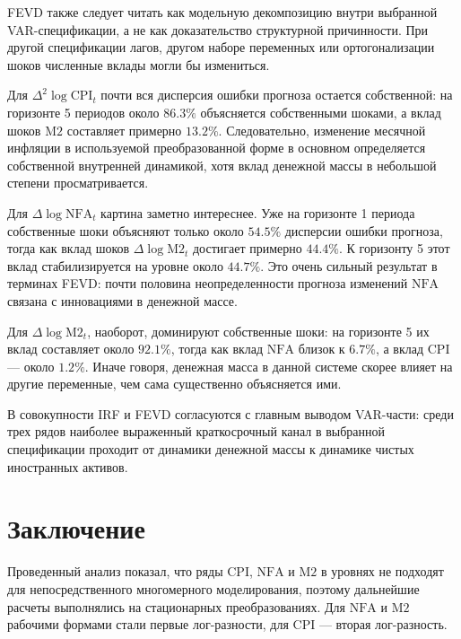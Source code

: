 \documentclass[12pt,a4paper]{article}
\begin{document}
FEVD также следует читать как модельную декомпозицию внутри выбранной VAR-спецификации, а
не как доказательство структурной причинности. При другой спецификации лагов, другом наборе
переменных или ортогонализации шоков численные вклады могли бы измениться.

Для $\Delta^2 \log \mathrm{CPI}_t$ почти вся дисперсия ошибки прогноза остается собственной:
на горизонте 5 периодов около $86.3\%$ объясняется собственными шоками, а вклад шоков $\mathrm{M2}$
составляет примерно $13.2\%$. Следовательно, изменение месячной инфляции в используемой
преобразованной форме в основном определяется собственной внутренней динамикой, хотя вклад
денежной массы в небольшой степени просматривается.

Для $\Delta \log \mathrm{NFA}_t$ картина заметно интереснее. Уже на горизонте 1 периода собственные
шоки объясняют только около $54.5\%$ дисперсии ошибки прогноза, тогда как вклад шоков
$\Delta \log \mathrm{M2}_t$ достигает примерно $44.4\%$. К горизонту 5 этот вклад стабилизируется на
уровне около $44.7\%$. Это очень сильный результат в терминах FEVD: почти половина
неопределенности прогноза изменений $\mathrm{NFA}$ связана с инновациями в денежной массе.

Для $\Delta \log \mathrm{M2}_t$, наоборот, доминируют собственные шоки: на горизонте 5 их вклад
составляет около $92.1\%$, тогда как вклад $\mathrm{NFA}$ близок к $6.7\%$, а вклад $\mathrm{CPI}$ --- около
$1.2\%$. Иначе говоря, денежная масса в данной системе скорее влияет на другие переменные,
чем сама существенно объясняется ими.

В совокупности IRF и FEVD согласуются с главным выводом VAR-части: среди трех рядов наиболее
выраженный краткосрочный канал в выбранной спецификации проходит от динамики денежной массы к
динамике чистых иностранных активов.

\section{Заключение}
Проведенный анализ показал, что ряды $\mathrm{CPI}$, $\mathrm{NFA}$ и $\mathrm{M2}$ в уровнях не подходят для
непосредственного многомерного моделирования, поэтому дальнейшие расчеты выполнялись на
стационарных преобразованиях. Для $\mathrm{NFA}$ и $\mathrm{M2}$ рабочими формами стали первые лог-разности,
для $\mathrm{CPI}$ --- вторая лог-разность.
\end{document}
